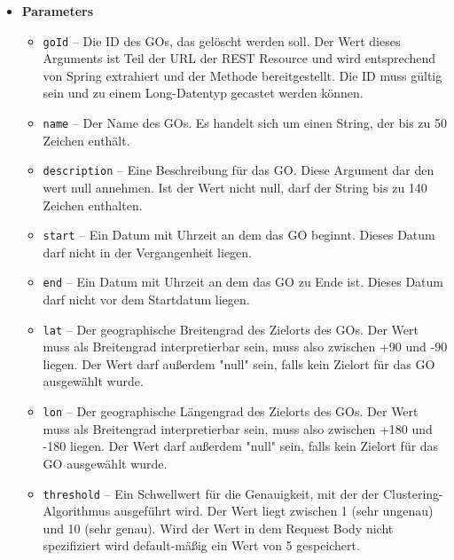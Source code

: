 \documentclass[11pt,a4paper]{article}
\begin{document}
{{{{{{{{{{{{{{{{{{\begin{itemize}
{\begin{itemize}
{Diese Methode wird von einem Benutzer aufgerufen, wenn er die Daten eines GOs ändern will. Zu den Daten, die mit dieser Methode geändert werden können, gehören: - der GO-Name - die GO-Beschreibung - Der Anfangs- und Endzeitpunkt - Der Zielort - Der Clustering-Schwellwert Es ist garantiert, dass dieser Aufruf nur von einem Go-Verantwortlichen des zu ändernden GOs kommt. Der Aufruf dieser Methode entspricht einem HTTP PUT-Request an den Server an die URL \{Base\_URL\}/gos/\{goId\}. Abgesehen von der Go ID, können sämtliche Argumente dieser Methode den Wert null annehmen. Dies signalisiert der Methode, das der Wert nicht geändert wurde und die bisherigen Daten beibehalten werden sollen.
}
\item{
{\bf  Parameters}
  \begin{itemize}
   \item{
\texttt{goId} -- Die ID des GOs, das gelöscht werden soll. Der Wert dieses Arguments ist Teil der URL der REST Resource und wird entsprechend von Spring extrahiert und der Methode bereitgestellt. Die ID muss gültig sein und zu einem Long-Datentyp gecastet werden können.}
   \item{
\texttt{name} -- Der Name des GOs. Es handelt sich um einen String, der bis zu 50 Zeichen enthält.}
   \item{
\texttt{description} -- Eine Beschreibung für das GO. Diese Argument dar den wert null annehmen. Ist der Wert nicht null, darf der String bis zu 140 Zeichen enthalten.}
   \item{
\texttt{start} -- Ein Datum mit Uhrzeit an dem das GO beginnt. Dieses Datum darf nicht in der Vergangenheit liegen.}
   \item{
\texttt{end} -- Ein Datum mit Uhrzeit an dem das GO zu Ende ist. Dieses Datum darf nicht vor dem Startdatum liegen.}
   \item{
\texttt{lat} -- Der geographische Breitengrad des Zielorts des GOs. Der Wert muss als Breitengrad interpretierbar sein, muss also zwischen +90 und -90 liegen. Der Wert darf außerdem "null" sein, falls kein Zielort für das GO ausgewählt wurde.}
   \item{
\texttt{lon} -- Der geographische Längengrad des Zielorts des GOs. Der Wert muss als Breitengrad interpretierbar sein, muss also zwischen +180 und -180 liegen. Der Wert darf außerdem "null" sein, falls kein Zielort für das GO ausgewählt wurde.}
   \item{
\texttt{threshold} -- Ein Schwellwert für die Genauigkeit, mit der der Clustering-Algorithmus ausgeführt wird. Der Wert liegt zwischen 1 (sehr ungenau) und 10 (sehr genau). Wird der Wert in dem Request Body nicht spezifiziert wird default-mäßig ein Wert von 5 gespeichert.}

\end{itemize}}
\end{itemize}}
\end{itemize}}}}}}}}}}}}}}}}}}}
\end{document}
